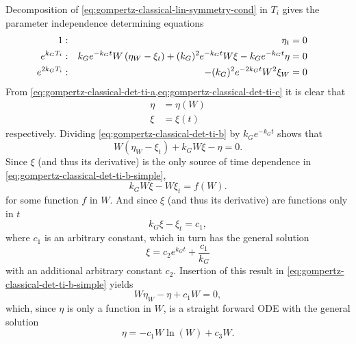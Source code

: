 Decomposition of \cref{eq:gompertz-classical-lin-symmetry-cond} in \(T_i\) gives the parameter independence determining equations
\begin{subequations}
  \begin{flalign}
    1 & : & \eta_t &= 0 && \FlLabel{eq:gompertz-classical-det-ti-a}\\
    e^{k_G T_i} & : & k_G e^{-k_G t} W \left(\eta_W - \xi_t\right) + (k_G)^2 e^{-k_G t} W \xi - k_G e^{-k_G t} \eta &= 0 && \FlLabel{eq:gompertz-classical-det-ti-b}\\
    e^{2 k_G T_i} & : & -(k_G)^2 e^{-2 k_G t} W^2 \xi_W &= 0 && \FlLabel{eq:gompertz-classical-det-ti-c}
  \end{flalign}
\end{subequations}
From \cref{eq:gompertz-classical-det-ti-a,eq:gompertz-classical-det-ti-c} it is clear that
\begin{align}
  \eta &= \eta(W) \\
  \xi &= \xi(t)
\end{align}
respectively.
Dividing \cref{eq:gompertz-classical-det-ti-b} by \(k_G e^{-k_G t}\) shows that
\begin{equation}\label{eq:gompertz-classical-det-ti-b-simple}
  W \left(\eta_W - \xi_t\right) + k_G W \xi - \eta = 0.
\end{equation}
Since \(\xi\) (and thus its derivative) is the only source of time dependence in \cref{eq:gompertz-classical-det-ti-b-simple},
\begin{equation}
  k_G W \xi - W \xi_t = f(W).
\end{equation}
for some function \(f\) in \(W\).
And since \(\xi\) (and thus its derivative) are functions only in \(t\)
\begin{equation}
  k_G \xi - \xi_t = c_1,
\end{equation}
where \(c_1\) is an arbitrary constant, which in turn has the general solution
\begin{equation}
  \xi = c_2 e^{k_G t} + \frac{c_1}{k_G}
\end{equation}
with an additional arbitrary constant \(c_2\).
Insertion of this result in \cref{eq:gompertz-classical-det-ti-b-simple} yields
\begin{equation}
  W \eta_W - \eta + c_1 W = 0,
\end{equation}
which, since \(\eta\) is only a function in \(W\), is a straight forward ODE with the general solution
\begin{equation}
  \eta = -c_1 W \ln(W) + c_3 W.
\end{equation}
